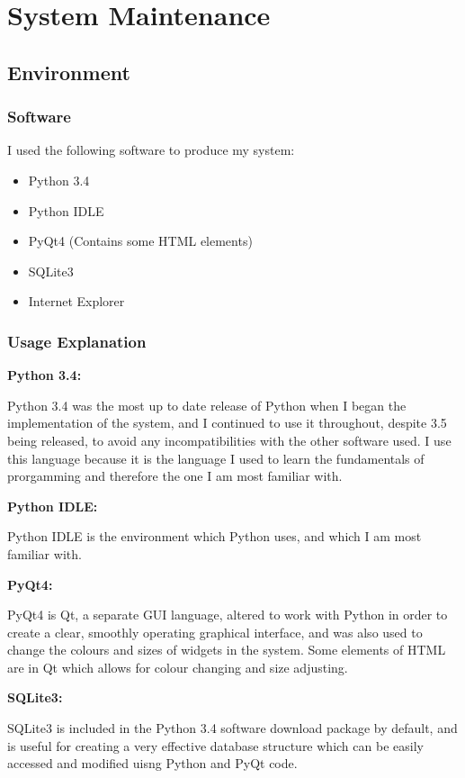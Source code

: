 \chapter{System Maintenance}

\section{Environment}

\subsection{Software}

I used the following software to produce my system:

\begin{itemize}
	\item Python 3.4
	\item Python IDLE
	\item PyQt4 (Contains some HTML elements)
	\item SQLite3
	\item Internet Explorer
\end{itemize}

\subsection{Usage Explanation}

\textbf{Python 3.4: }

Python 3.4 was the most up to date release of Python when I began the implementation of the system, and I continued to use it throughout, despite 3.5 being released, to avoid any incompatibilities with the other software used. I use this language because it is the language I used to learn the fundamentals of prorgamming and therefore the one I am most familiar with. 

\textbf{Python IDLE: }

Python IDLE is the environment which Python uses, and which I am most familiar with.

\textbf{PyQt4: }

PyQt4 is Qt, a separate GUI language, altered to work with Python in order to create a clear, smoothly operating graphical interface, and was also used to change the colours and sizes of widgets in the system. Some elements of HTML are in Qt which allows for colour changing and size adjusting.

\textbf{SQLite3: }

SQLite3 is included in the Python 3.4 software download package by default, and is useful for creating a very effective database structure which can be easily accessed and modified uisng Python and PyQt code. 

